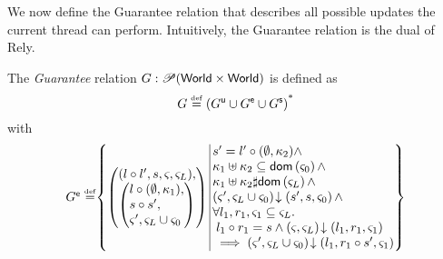 We now define the Guarantee relation  that describes all possible updates the current thread can perform. Intuitively, the Guarantee relation is the dual of Rely.
%
\begin{definition}[Guarantee]
The \emph{Guarantee} relation $G: \mathscr{P} (\textsf{World} \times \textsf{World})$ is defined as
%
\[
	G \mathrel{\stackrel{\smash{\scriptscriptstyle{\mathrm{def}}}}{=}}  \left( G^{\textsf{u}} \cup G^{\textsf{e}} \cup G^{\textsf{s}} \right)^{\text{*}}
\]
%
with
%
\[
\begin{array}{@{} r @{} l @{}}

	\extendG \eqdef &
 	\left\{
	\begin{array}{@{} l @{\hspace*{2pt}} | @{\hspace*{2pt}} r @{}}
	   \left(
	   \begin{array}{@{} l @{}}
	     (l \composeL l', s, \amod{}, \amod{L}),\\
 	     \left(
	     \begin{array}{@{} l @{}}
	      l \composeL (\unitH, \ca{1}),\\
	      s \composeL s',\\
	      \amod{}', \amod{L} \cup \amod{0}
	     \end{array}
 	    \right)
	   \end{array}
 	  \right)
	   &
 	  	\begin{array}{@{} l @{}}
	 	  	s' = l' \composeL (\unitH, \ca{2})  \land\\
	 	  	
	 	  	\ca{1} \composeCap \ca{2} \subseteq \dom{\amod{0}} \land \\
	 	  	
	 	  	\ca{1} \composeCap \ca{2} \disjoint \dom{\amod{L}} \land \\
	 	  	
			\extendsAM{\amod{}', \amod{L} \cup \amod{0}}{s'}{s}{\amod{0}} \land \\
			
			\for{l_1, r_1, \amod{1} \subseteq \amod{L}} \\
			\hspace*{0.1cm} l_1 \composeL r_1 = s \land \extendsAM{\amod{}, \amod{L}}{l_1}{r_1}{\amod{1}}  \\
			\hspace*{0.1cm} \implies\extendsAM{\amod{}', \amod{L} \cup \amod{0}}{l_1}{r_1 \composeL s'}{\amod{1}}
			
     	
   		\end{array}
 	\end{array}
	\right\}\\
	

\end{array}\]
\end{definition}
